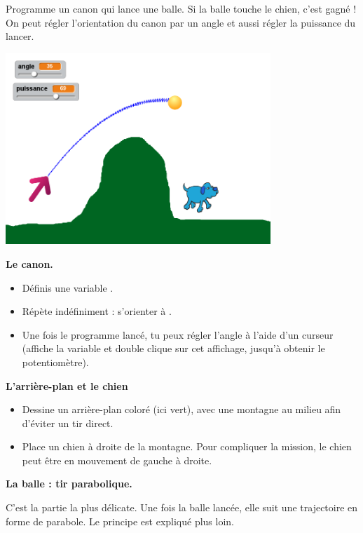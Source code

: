 \documentclass[class=report,crop=false, 12pt]{standalone}
\begin{document}
\begin{activite}

Programme un canon qui lance une balle. Si la balle touche le chien, c'est gagné !
On peut régler l'orientation du canon par un angle et aussi régler la puissance du lancer.

\begin{center}
  \includegraphics[width=0.75\textwidth]{ecran-08-ex3} 
\end{center}



\textbf{Le canon.}

\begin{itemize}
  \item Définis une variable .
  \item Répète indéfiniment : s'orienter à .
  \item Une fois le programme lancé, tu peux régler l'angle à l'aide d'un curseur (affiche la variable  et double clique sur cet affichage, jusqu'à obtenir le potentiomètre).
\end{itemize}

\bigskip

\textbf{L'arrière-plan et le chien}
\begin{itemize}
  \item Dessine un arrière-plan coloré (ici vert), avec une montagne au milieu afin d'éviter un tir direct.
  \item Place un chien à droite de la montagne. Pour compliquer la mission, le chien peut être en mouvement de gauche à droite.
\end{itemize}

\bigskip
\textbf{La balle : tir parabolique.}

C'est la partie la plus délicate. Une fois la balle lancée, elle suit une trajectoire en forme de parabole. Le principe est expliqué plus loin.


\end{activite}
\end{document}

